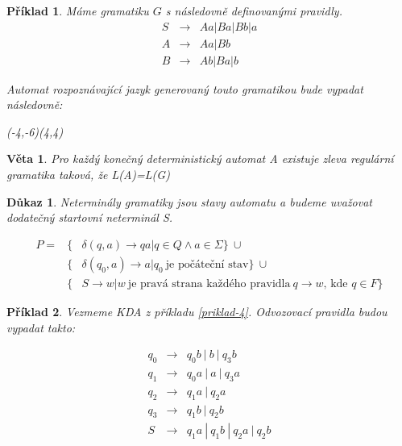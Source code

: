 \documentclass[10pt, a4paper, titlepage]{article}
\theoremstyle{note}
\newtheorem{dukaz}{Důkaz}
\newtheorem{veta}{Věta}
\newtheorem{priklad}{Příklad}
\begin{document}
\begin{priklad}
Máme gramatiku $G$ s následovně definovanými pravidly.
\begin{eqnarray*}
S &\rightarrow& Aa|Ba|Bb|a \\
A &\rightarrow& Aa|Bb \\
B &\rightarrow& Ab|Ba|b
\end{eqnarray*}

Automat rozpoznávající jazyk generovaný touto gramatikou bude vypadat následovně:

\begin{center}
\begin{VCPicture}{(-4,-6)(4,4)}
\end{VCPicture}
\end{center}

\end{priklad}

\begin{veta}
Pro každý konečný deterministický automat \textit{A} existuje zleva regulární gramatika taková, že \textit{L(A)=L(G)}
\end{veta}

\begin{dukaz}
Neterminály gramatiky jsou stavy automatu a budeme uvažovat dodatečný startovní neterminál S.

\begin{eqnarray*}
P = &\lbrace& \delta (q,a) \rightarrow qa | q \in Q \wedge a \in \Sigma \rbrace \ \cup \\
&\lbrace& \delta (q_0,a) \rightarrow a | q_0\ \text{je počáteční stav} \rbrace \ \cup \\
&\lbrace& S \rightarrow w|w \ \text{je pravá strana každého pravidla}\ q \rightarrow w\text{, kde } q \in F \rbrace
\end{eqnarray*}

\end{dukaz}

\begin{priklad}
Vezmeme KDA z příkladu \ref{priklad-4}.
Odvozovací pravidla budou vypadat takto:

\begin{eqnarray*}
q_0 &\rightarrow& q_{0}b\ |\ b\ |\ q_{3}b \\
q_1 &\rightarrow& q_{0}a\ |\ a\ |\ q_{3}a \\
q_2 &\rightarrow& q_{1}a\ |\ q_{2}a \\
q_3 &\rightarrow& q_{1}b\ |\ q_{2}b \\
S &\rightarrow& q_{1}a\ |\ q_{1}b\ |\ q_{2}a\ |\ q_{2}b \\
\end{eqnarray*}

\end{priklad}
\end{document}
